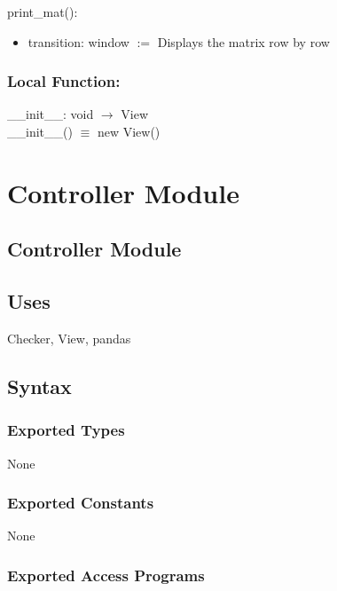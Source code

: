 \documentclass[12pt]{article}
\begin{document}
\noindent print\_mat():
\begin{itemize}
\item transition: window $:=$ Displays the matrix row by row
\end{itemize}

\subsubsection*{Local Function:}

\_\_init\_\_: void $\rightarrow$ View \\
\_\_init\_\_() $\equiv$ new View()

\newpage

\section* {Controller Module}

\subsection* {Controller Module}

\subsection* {Uses}

Checker, View, pandas

\subsection* {Syntax}

\subsubsection* {Exported Types}

None

\subsubsection* {Exported Constants}

None

\subsubsection* {Exported Access Programs}
\end{document}
